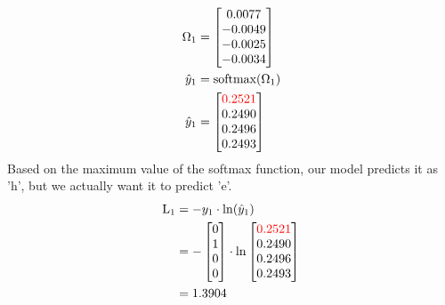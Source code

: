 \documentclass{article}
\begin{document}
\begin{align*}
    \Omega_1 & = \begin{bmatrix}
  0.0077 \\
 -0.0049 \\
 -0.0025 \\
 -0.0034
\end{bmatrix} \\
    \hat{y}_1 & = \text{softmax}(\Omega_1) \\
    \hat{y}_1 & = \begin{bmatrix}
 \textcolor{red}{0.2521} \\
 0.2490 \\
 0.2496 \\
 0.2493
\end{bmatrix}
\end{align*}
Based on the maximum value of the softmax function, our model predicts it as 'h', but we actually want it to predict 'e'.
\begin{align*}
    \text{L}_{1} & = -y_1 \cdot \ln(\hat{y}_1) \\
    &=-\begin{bmatrix} 0 \\ 1 \\ 0 \\ 0 \end{bmatrix} \cdot \ln{\begin{bmatrix}
 \textcolor{red}{0.2521} \\
 0.2490 \\
 0.2496 \\
 0.2493
\end{bmatrix}}\\
    &=1.3904
\end{align*}
\end{document}
